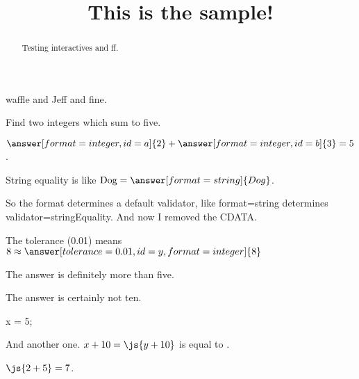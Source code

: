\documentclass{ximera}
\title{This is the sample!}
\begin{document}
\begin{abstract}
Testing interactives and ff.
\end{abstract}

\maketitle

waffle and Jeff and fine.


\begin{problem}
  Find two integers which sum to five.

  \begin{validator}[a+b==5]
    $\answer[format=integer,id=a]{2} + \answer[format=integer,id=b]{3} = 5$.
  \end{validator}
\end{problem}

\begin{problem}
  String equality is like $\mbox{Dog} = \answer[format=string]{Dog}$.

  So the format determines a default validator, like format=string determines validator=stringEquality.  And now I removed the CDATA.
\end{problem}

\begin{problem}
  The tolerance (0.01) means $8 \approx \answer[tolerance=0.01,id=y,format=integer]{8}$
  
  \begin{feedback}[$5$]
    The answer is definitely more than five.
  \end{feedback}

  \begin{feedback}[$10$]
    The answer is certainly not ten.
  \end{feedback}
\end{problem}

\begin{javascript}
x = 5;
\end{javascript}

And another one.  $x + 10 = \js{y+10}$ is equal to .

$\js{2+5} = 7$.
\end{document}
